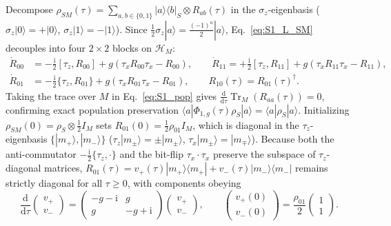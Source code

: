 \documentclass[onecolumn,10pt,notitlepage,amsmath,amssymb,floatfix]{revtex4-2}
\theoremstyle{plain}
\theoremstyle{definition}
\newcommand{\dd}{\mathrm{d}}
\newcommand{\ii}{\mathrm{i}}
\newcommand{\Tr}{\operatorname{Tr}}
\begin{document}
Decompose $\rho_{SM}(\tau) = \sum_{a,b\in\{0,1\}} |a\rangle\langle b|_S \otimes R_{ab}(\tau)$ in the $\sigma_z$-eigenbasis ($\sigma_z|0\rangle = +|0\rangle$, $\sigma_z|1\rangle = -|1\rangle$). Since $\frac{1}{2}\sigma_z|a\rangle = \frac{(-1)^a}{2}|a\rangle$, Eq.~\eqref{eq:S1_L_SM} decouples into four $2\times 2$ blocks on $\mathcal{H}_M$:
\begin{align}
\dot{R}_{00} &= -\frac{\ii}{2}[\tau_z, R_{00}] + g(\tau_x R_{00}\tau_x - R_{00}), \qquad
\dot{R}_{11} = +\frac{\ii}{2}[\tau_z, R_{11}] + g(\tau_x R_{11}\tau_x - R_{11}), \label{eq:S1_pop}\\
\dot{R}_{01} &= -\frac{\ii}{2}\{\tau_z, R_{01}\} + g(\tau_x R_{01}\tau_x - R_{01}), \qquad
R_{10}(\tau) = R_{01}(\tau)^\dagger. \label{eq:S1_coh}
\end{align}
Taking the trace over $M$ in Eq.~\eqref{eq:S1_pop} gives $\frac{\dd}{\dd\tau}\Tr_M(R_{aa}(\tau)) = 0$, confirming exact population preservation $\langle a|\Phi_{1,g}(\tau)\rho_S|a\rangle = \langle a|\rho_S|a\rangle$. Initializing $\rho_{SM}(0) = \rho_S \otimes \frac{1}{2}I_M$ sets $R_{01}(0) = \frac{1}{2}\rho_{01} I_M$, which is diagonal in the $\tau_z$-eigenbasis $\{|m_+\rangle, |m_-\rangle\}$ ($\tau_z|m_\pm\rangle = \pm|m_\pm\rangle$, $\tau_x|m_\pm\rangle = |m_\mp\rangle$). Because both the anti-commutator $-\frac{\ii}{2}\{\tau_z, \cdot\}$ and the bit-flip $\tau_x \cdot \tau_x$ preserve the subspace of $\tau_z$-diagonal matrices, $R_{01}(\tau) = v_+(\tau)|m_+\rangle\langle m_+| + v_-(\tau)|m_-\rangle\langle m_-|$ remains strictly diagonal for all $\tau \ge 0$, with components obeying
\begin{equation}
\label{eq:S1_v_ode}
\frac{\dd}{\dd\tau}\begin{pmatrix} v_+ \\ v_- \end{pmatrix}
= \begin{pmatrix} -g - \ii & g \\ g & -g + \ii \end{pmatrix}\begin{pmatrix} v_+ \\ v_- \end{pmatrix}, \qquad
\begin{pmatrix} v_+(0) \\ v_-(0) \end{pmatrix} = \frac{\rho_{01}}{2}\begin{pmatrix} 1 \\ 1 \end{pmatrix}.
\end{equation}
\end{document}
